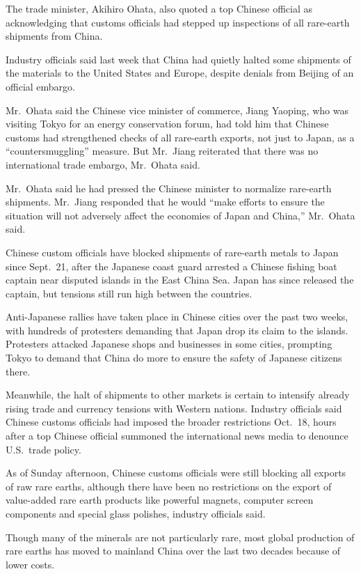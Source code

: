﻿\documentclass[12pt]{article}
\begin{document}
The trade minister, Akihiro Ohata, also quoted a top Chinese official as acknowledging that customs
officials had stepped up inspections of all rare-earth shipments from China.

Industry officials said last week that China had quietly halted some shipments of the materials to
the United States and Europe, despite denials from Beijing of an official embargo.

Mr.~Ohata said the Chinese vice minister of commerce, Jiang Yaoping, who was visiting Tokyo for an
energy conservation forum, had told him that Chinese customs had strengthened checks of all
rare-earth exports, not just to Japan, as a ``countersmuggling'' measure. But Mr.~Jiang reiterated
that there was no international trade embargo, Mr.~Ohata said.

Mr.~Ohata said he had pressed the Chinese minister to normalize rare-earth shipments. Mr.~Jiang
responded that he would ``make efforts to ensure the situation will not adversely affect the
economies of Japan and China,'' Mr.~Ohata said.

Chinese custom officials have blocked shipments of rare-earth metals to Japan since Sept.~21, after
the Japanese coast guard arrested a Chinese fishing boat captain near disputed islands in the East
China Sea. Japan has since released the captain, but tensions still run high between the countries.

Anti-Japanese rallies have taken place in Chinese cities over the past two weeks, with hundreds of
protesters demanding that Japan drop its claim to the islands. Protesters attacked Japanese shops
and businesses in some cities, prompting Tokyo to demand that China do more to ensure the safety of
Japanese citizens there.

Meanwhile, the halt of shipments to other markets is certain to intensify already rising trade and
currency tensions with Western nations. Industry officials said Chinese customs officials had
imposed the broader restrictions Oct.~18, hours after a top Chinese official summoned the
international news media to denounce U.S.~trade policy.

As of Sunday afternoon, Chinese customs officials were still blocking all exports of raw rare
earths, although there have been no restrictions on the export of value-added rare earth products
like powerful magnets, computer screen components and special glass polishes, industry officials
said.

Though many of the minerals are not particularly rare, most global production of rare earths has
moved to mainland China over the last two decades because of lower costs.
\end{document}
